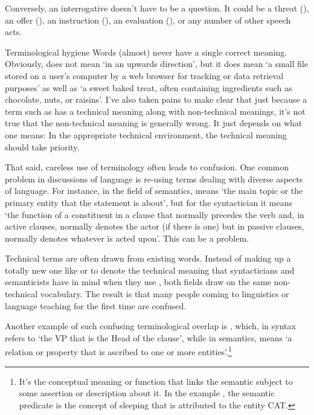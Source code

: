 Conversely, an interrogative doesn't have to be a question. It could be a threat (), an offer (), an instruction (), an evaluation (), or any number of other speech acts.


\begin{tblsframed}{Terminological hygiene}
\label{box:terminology-hygiene}
\setlength{\parindent}{1.5em}
    \noindent Words (almost) never have a single correct meaning. Obviously,  does not mean `in an upwards direction', but it does mean `a small file stored on a user's computer by a web browser for tracking or data retrieval purposes' as well as `a sweet baked treat, often containing ingredients such as chocolate, nuts, or raisins'. I've also taken pains to make clear that just because a term such as  has a technical meaning along with non-technical meanings, it's not true that the non-technical meaning is generally wrong. It just depends on what one means: In the appropriate technical environment, the technical meaning should take priority.

    That said, careless use of terminology often leads to confusion. One common problem in discussions of language is re-using terms dealing with diverse aspects of language. For instance, in the field of semantics,  means `the main topic or the primary entity that the statement is about', but for the syntactician it means `the function of a constituent in a clause that normally precedes the verb and, in active clauses, normally denotes the actor (if there is one) but in passive clauses, normally denotes whatever is acted upon'. This can be a problem.

    Technical terms are often drawn from existing words. Instead of making up a totally new one like  or  to denote the technical meaning that syntacticians and semanticists have in mind when they use , both fields draw on the same non-technical vocabulary. The result is that many people coming to linguistics or language teaching for the first time are confused.

    Another example of such confusing terminological overlap is , which, in syntax refers to `the VP that is the \textsf{Head} of the clause', while in semantics, means `a relation or property that is ascribed to one or more entities'.\footnote{It's the conceptual meaning or function that links the semantic subject to some assertion or description about it. In the example , the semantic predicate is the concept of sleeping that is attributed to the entity CAT.}


\end{tblsframed}
